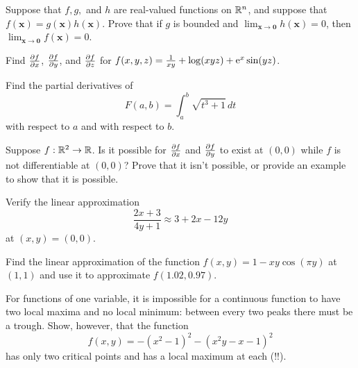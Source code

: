 \documentclass{watsonbook}
\begin{document}
\begin{aexercise}
  Suppose that $f,g,$ and $h$ are real-valued functions on $\mathbb{R}^n$, and
  suppose that $f(\mathbf{x}) = g(\mathbf{x})h(\mathbf{x})$. Prove that if $g$
  is bounded and $\lim_{\mathbf{x}\to \mathbf{0}}h(\mathbf{x}) = 0$, then
  $\lim_{\mathbf{x}\to \mathbf{0}}f(\mathbf{x}) = 0$.
\end{aexercise}


\begin{aexercise}
  Find $\frac{\partial f}{\partial x}$, $\frac{\partial f}{\partial y}$, and $\frac{\partial f}{\partial z}$ for
  $f(x,y,z) = \frac{1}{xy} + \log(xyz) + \operatorname{e}^x\sin(y z) $.
\end{aexercise}

\begin{aexercise}
  Find the partial derivatives of
  \[
    F(a,b) = \int_a^b \sqrt{t^3+1}\,dt
  \]
  with respect to $a$ and with respect to $b$.
\end{aexercise}


\begin{aexercise}
  Suppose $f:\mathbb{R}^2 \to \mathbb{R}$. Is it possible for $\frac{\partial f}{\partial x}$ and
  $\frac{\partial f}{\partial y}$ to exist at $(0,0)$ while $f$ is not differentiable at
  $(0,0)$?  Prove that it isn't possible, or provide an example to
  show that it is possible.
\end{aexercise}


\begin{aexercise}
  Verify the linear approximation
  \[
    \frac{2x+3}{4y+1} \approx 3 + 2x - 12y
  \]
  at $(x,y) = (0,0)$.
\end{aexercise}

\begin{aexercise}
  Find the linear approximation of the function
  $f(x,y) = 1-xy\cos(\pi y)$ at $(1,1)$ and use it to approximate
  $f(1.02,0.97)$.
\end{aexercise}




\begin{aexercise}
  For functions of one variable, it is impossible for a continuous
  function to have two local maxima and no local minimum: between
  every two peaks there must be a trough. Show, however, that the
  function
  \[
    f(x,y) = -(x^2-1)^2-(x^2y-x-1)^2
  \]
  has only two critical points and has a local maximum at each (!!). 
\end{aexercise}
\end{document}

